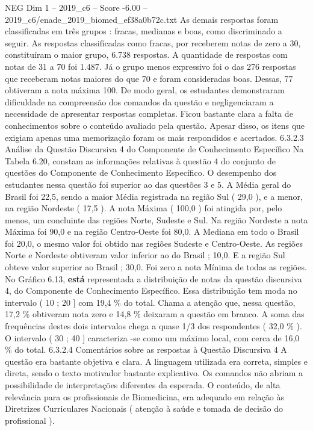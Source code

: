 \begin{textsample}{NEG Dim 1 – 2019\_c6 – Score -6.00 – 2019\_c6/enade\_2019\_biomed\_ef38a0b72c.txt}
As demais respostas foram classificadas em três grupos : fracas, medianas e boas, como discriminado a seguir.
As respostas classificadas como fracas, por receberem notas de zero a 30, constituíram o maior grupo, 6.738 respostas.
A quantidade de respostas com notas de 31 a 70 foi 1.487.
Já o grupo menos expressivo foi o das 276 respostas que receberam notas maiores do que 70 e foram consideradas boas.
Dessas, 77 obtiveram a nota máxima 100.
De modo geral, os estudantes demonstraram dificuldade na compreensão dos comandos da questão e negligenciaram a necessidade de apresentar respostas completas.
Ficou bastante clara a falta de conhecimentos sobre o conteúdo avaliado pela questão.
Apesar disso, os itens que exigiam apenas uma memorização foram os mais respondidos e acertados. 6.3.2.3 Análise da Questão Discursiva 4 do Componente de Conhecimento Específico Na Tabela 6.20, constam as informações relativas à questão 4 do conjunto de questões do Componente de Conhecimento Específico.
O desempenho dos estudantes nessa questão foi superior ao das questões 3 e 5.
A Média geral do Brasil foi 22,5, sendo a maior Média registrada na região Sul ( 29,0 ), e a menor, na região Nordeste ( 17,5 ).
A nota Máxima ( 100,0 ) foi atingida por, pelo menos, um concluinte das regiões Norte, Sudeste e Sul.
Na região Nordeste a nota Máxima foi 90,0 e na região Centro-Oeste foi 80,0.
A Mediana em todo o Brasil foi 20,0, o mesmo valor foi obtido nas regiões Sudeste e Centro-Oeste.
As regiões Norte e Nordeste obtiveram valor inferior ao do Brasil ; 10,0.
E a região Sul obteve valor superior ao Brasil ; 30,0.
Foi zero a nota Mínima de todas as regiões.
No Gráfico 6.13, \textbf{está} representada a distribuição de notas da questão discursiva 4, do Componente de Conhecimento Específico.
Essa distribuição tem moda no intervalo ( 10 ; 20 ] com 19,4 \% do total.
Chama a atenção que, nessa questão, 17,2 \% obtiveram nota zero e 14,8 \% deixaram a questão em branco.
A soma das frequências destes dois intervalos chega a quase 1/3 dos respondentes ( 32,0 \% ).
O intervalo ( 30 ; 40 ] caracteriza -se como um máximo local, com cerca de 16,0 \% do total. 6.3.2.4 Comentários sobre as respostas à Questão Discursiva 4 A questão era bastante objetiva e clara.
A linguagem utilizada era correta, simples e direta, sendo o texto motivador bastante explicativo.
Os comandos não abriam a possibilidade de interpretações diferentes da esperada.
O conteúdo, de alta relevância para os profissionais de Biomedicina, era adequado em relação às Diretrizes Curriculares Nacionais ( atenção à saúde e tomada de decisão do profissional ).

\end{textsample}
